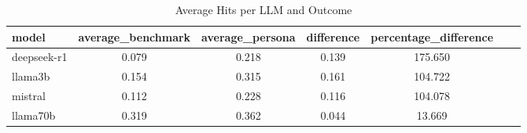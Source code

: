 \begin{table}
\caption{Average Hits per LLM and Outcome}
\label{tab:average_hits}
\begin{tabular}{lcccccc}
\toprule
model & average_benchmark & average_persona & difference & percentage_difference \\
\midrule
deepseek-r1 & 0.079 & 0.218 & 0.139 & 175.650 \\
llama3b & 0.154 & 0.315 & 0.161 & 104.722 \\
mistral & 0.112 & 0.228 & 0.116 & 104.078 \\
llama70b & 0.319 & 0.362 & 0.044 & 13.669 \\
\bottomrule
\end{tabular}
\end{table}

